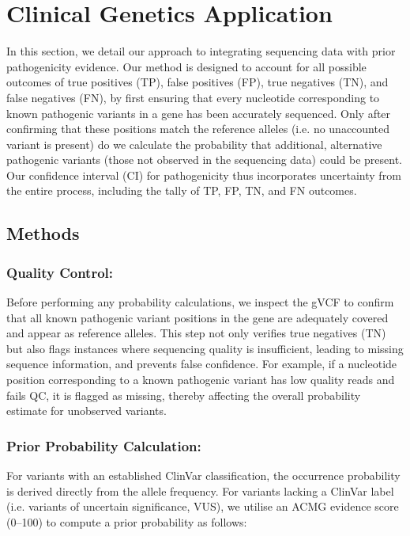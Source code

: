 \FloatBarrier
\clearpage
\section{Clinical Genetics Application}

In this section, we detail our approach to integrating sequencing data with prior pathogenicity evidence. Our method is designed to account for all possible outcomes of true positives (TP), false positives (FP), true negatives (TN), and false negatives (FN), by first ensuring that every nucleotide corresponding to known pathogenic variants in a gene has been accurately sequenced. Only after confirming that these positions match the reference alleles (i.e. no unaccounted variant is present) do we calculate the probability that additional, alternative pathogenic variants (those not observed in the sequencing data) could be present. Our confidence interval (CI) for pathogenicity thus incorporates uncertainty from the entire process, including the tally of TP, FP, TN, and FN outcomes.

\subsection{Methods}
\subsubsection{Quality Control:}  
Before performing any probability calculations, we inspect the gVCF to confirm that all known pathogenic variant positions in the gene are adequately covered and appear as reference alleles. This step not only verifies true negatives (TN) but also flags instances where sequencing quality is insufficient, leading to missing sequence information, and prevents false confidence. For example, if a nucleotide position corresponding to a known pathogenic variant has low quality reads and fails QC, it is flagged as missing, thereby affecting the overall probability estimate for unobserved variants.

\subsubsection{Prior Probability Calculation:}  
For variants with an established ClinVar classification, the occurrence probability is derived directly from the allele frequency. For variants lacking a ClinVar label (i.e. variants of uncertain significance, VUS), we utilise an ACMG evidence score (0–100) to compute a prior probability as follows:

